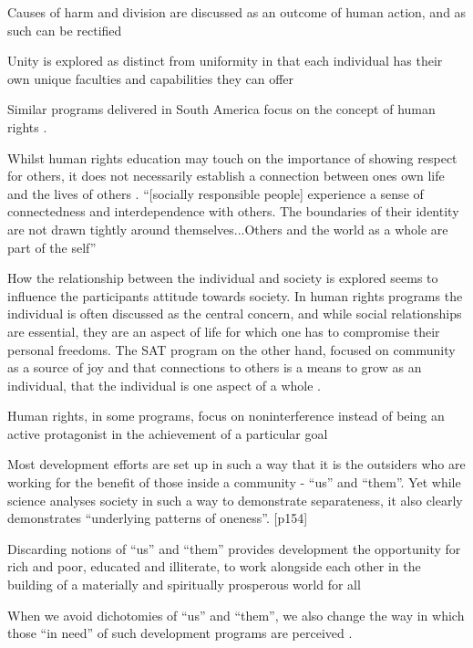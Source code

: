 Causes of harm and division are discussed as an outcome of human action, and as such can be rectified \citep{Honeyman2010}

Unity is explored as distinct from uniformity in that each individual has their own unique faculties and capabilities they can offer \citep{Honeyman2010}

Similar programs delivered in South America focus on the concept of human rights \citep{Honeyman2010}.

Whilst human rights education may touch on the importance of showing respect for others, it does not necessarily establish a connection between ones own life and the lives of others \citep{Honeyman2010}. 
“[socially responsible people] experience a sense of connectedness and interdependence with others. The boundaries of their identity are not drawn tightly around themselves...Others and the world as a whole are part of the self” \citep[][p13]{Berman1997} %

How the relationship between the individual and society is explored seems to influence the participants attitude towards society. In human rights programs the individual is often discussed as the central concern, and while social relationships are essential, they are an aspect of life for which one has to compromise their personal freedoms. The SAT program on the other hand, focused on community as a source of joy and that connections to others is a means to grow as an individual, that the individual is one aspect of a whole \citep{Honeyman2010}.

Human rights, in some programs, focus on noninterference instead of being an active protagonist in the achievement of a particular goal \citep{Honeyman2010}



Most development efforts are set up in such a way that it is the outsiders who are working for the benefit of those inside a community - “us” and “them”. Yet while science analyses society in such a way to demonstrate separateness, it also clearly demonstrates “underlying patterns of oneness”. [p154] \citep{Arbab2000}

Discarding notions of “us” and “them” provides development the opportunity for rich and poor, educated and illiterate, to work alongside each other in the building of a materially and spiritually prosperous world for all \citep{Arbab2000} %

When we avoid dichotomies of “us” and “them”, we also change the way in which those “in need” of such development programs are perceived \citep{Arbab2000}.

